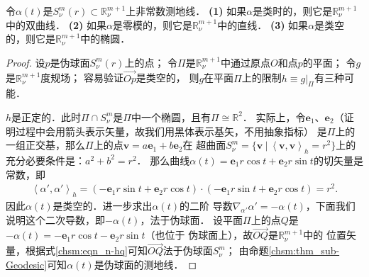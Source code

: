 \begin{proposition}
    令$\alpha(t)$是$S^m_\nu(r) \subset \mathbb{R}^{m+1}_\nu$上非常数测地线．
    {\bfseries (1)} 如果$\alpha$是类时的，则它是$\mathbb{R}^{m+1}_\nu$中的双曲线．    
    {\bfseries (2)} 如果$\alpha$是零模的，则它是$\mathbb{R}^{m+1}_\nu$中的直线．    
    {\bfseries (3)} 如果$\alpha$是类空的，则它是$\mathbb{R}^{m+1}_\nu$中的椭圆．
\end{proposition}

\begin{proof}
    设$p$是伪球面$S^m_\nu(r)$上的点；
    令$\Pi$是$\mathbb{R}^{m+1}_\nu$中通过原点$O$和点$p$的平面；
    令$g$是$\mathbb{R}^{m+1}_\nu$度规场；
    容易验证$\overrightarrow{Op}$是类空的，
    则$g$在平面$\Pi$上的限制$h\equiv g|_\Pi$有三种可能．
    
     $h$是正定的．此时$\Pi \cap S^m_\nu$是$\Pi$中一个椭圆，且有$\Pi \cong \mathbb{R}^{2}$．
    实际上，令$\boldsymbol{e}_1$、$\boldsymbol{e}_2$（证明过程中会用箭头表示矢量，故我们用黑体表示基矢，不用抽象指标）
    是$\Pi$上的一组正交基，那么$\Pi$上的点$\boldsymbol{v}=a\boldsymbol{e}_1+b\boldsymbol{e}_2$在
    超曲面$S^m_\nu=\{\boldsymbol{v} \ | \  \left<\boldsymbol{v} ,\boldsymbol{v}\right>_h = r^2 \}$上的充分必要条件是：$a^2+b^2=r^2$．
    那么曲线$\alpha(t)= \boldsymbol{e}_1 r \cos t +\boldsymbol{e}_2 r \sin t $的切矢量是常数，即
    \begin{align*}
        \left<\alpha', \alpha'\right>_h
        =\left( -\boldsymbol{e}_1 r \sin t +\boldsymbol{e}_2 r \cos t \right) \cdot 
         \left( -\boldsymbol{e}_1 r \sin t +\boldsymbol{e}_2 r \cos t \right)
        = r^2 .
    \end{align*}
    因此$\alpha(t)$是类空的．进一步求出$\alpha(t)$的二阶
    导数$\nabla_{\alpha'}\alpha' =-\alpha(t)$，下面我们说明这个二次导数，即$-\alpha(t)$，法于伪球面．
    设平面$\Pi$上的点$Q$是$-\alpha(t)= -\boldsymbol{e}_1 r \cos t -\boldsymbol{e}_2 r \sin t $（也位于
    伪球面上），故$\overrightarrow{OQ}$是$\mathbb{R}^{m+1}_\nu$中的
    位置矢量，根据式\eqref{chsm:eqn_n-hq}可知$\overrightarrow{OQ}$法于伪球面$S^m_\nu$；
    由命题\ref{chsm:thm_sub-Geodesic}可知$\alpha(t)$是伪球面的测地线．
    

\end{proof}

